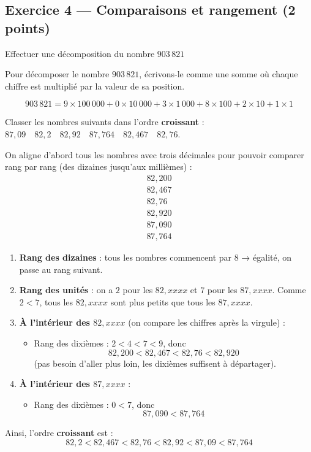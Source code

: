 \documentclass[answers]{exam}
\begin{document}
\subsection*{Exercice 4 — Comparaisons et rangement (2 points)}

\begin{questions}
  \question[0.5] Effectuer une décomposition du nombre $903\,821$
  \begin{solution}
Pour décomposer le nombre \(903\,821\), écrivons-le comme une somme où chaque chiffre est multiplié par la valeur de sa position.

\[
903\,821 = 9 \times 100\,000 + 0 \times 10\,000 + 3 \times 1\,000 + 8 \times 100 + 2 \times 10 + 1 \times 1
\]
\end{solution}
  \question[1.5] Classer les nombres suivants dans l'ordre \textbf{croissant} :  
  $87,09 \quad 82,2 \quad 82,92 \quad 87,764 \quad 82,467 \quad 82,76$.
\end{questions}

\begin{solution}
On aligne d'abord tous les nombres avec trois décimales pour pouvoir comparer rang par rang (des dizaines jusqu’aux millièmes) :
\[
\begin{array}{r}
82,200\\
82,467\\
82,76\\
82,920\\
87,090\\
87,764
\end{array}
\]

\begin{enumerate}
  \item \textbf{Rang des dizaines} : tous les nombres commencent par \(8\) → égalité, on passe au rang suivant.
  \item \textbf{Rang des unités} : on a \(2\) pour les \(82,xxxx\) et \(7\) pour les \(87,xxxx\).  
  Comme \(2 < 7\), tous les \(82,xxxx\) sont plus petits que tous les \(87,xxxx\).
  \item \textbf{À l’intérieur des \(82,xxxx\)} (on compare les chiffres après la virgule) :
    \begin{itemize}
      \item Rang des dixièmes : \(2 < 4 < 7 < 9\), donc  
      \[
      82,200 < 82,467 < 82,76 < 82,920
      \]
      (pas besoin d’aller plus loin, les dixièmes suffisent à départager).
    \end{itemize}
  \item \textbf{À l’intérieur des \(87,xxxx\)} :
    \begin{itemize}
      \item Rang des dixièmes : \(0 < 7\), donc  
      \[
      87,090 < 87,764
      \]
    \end{itemize}
\end{enumerate}

Ainsi, l’ordre \textbf{croissant} est :
\[
82,2 < 82,467 < 82,76 < 82,92 < 87,09 < 87,764
\]
\end{solution}
\end{document}
